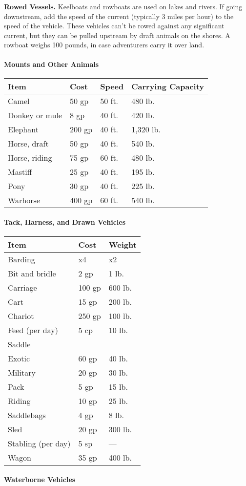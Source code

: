 \documentclass[
]{article}
\begin{document}
\textbf{Rowed Vessels.} Keelboats and rowboats are used on lakes and
rivers. If going downstream, add the speed of the current (typically 3
miles per hour) to the speed of the vehicle. These vehicles can't be
rowed against any significant current, but they can be pulled upstream
by draft animals on the shores. A rowboat weighs 100 pounds, in case
adventurers carry it over land.

\hypertarget{mounts-and-other-animals}{%
\paragraph{Mounts and Other Animals}\label{mounts-and-other-animals}}

\begin{longtable}[]{@{}llll@{}}
\toprule
Item & Cost & Speed & Carrying Capacity\tabularnewline
\midrule
\endhead
Camel & 50 gp & 50 ft. & 480 lb.\tabularnewline
Donkey or mule & 8 gp & 40 ft. & 420 lb.\tabularnewline
Elephant & 200 gp & 40 ft. & 1,320 lb.\tabularnewline
Horse, draft & 50 gp & 40 ft. & 540 lb.\tabularnewline
Horse, riding & 75 gp & 60 ft. & 480 lb.\tabularnewline
Mastiff & 25 gp & 40 ft. & 195 lb.\tabularnewline
Pony & 30 gp & 40 ft. & 225 lb.\tabularnewline
Warhorse & 400 gp & 60 ft. & 540 lb.\tabularnewline
\bottomrule
\end{longtable}

\hypertarget{tack-harness-and-drawn-vehicles}{%
\paragraph{Tack, Harness, and Drawn
Vehicles}\label{tack-harness-and-drawn-vehicles}}

\begin{longtable}[]{@{}lll@{}}
\toprule
Item & Cost & Weight\tabularnewline
\midrule
\endhead
Barding & x4 & x2\tabularnewline
Bit and bridle & 2 gp & 1 lb.\tabularnewline
Carriage & 100 gp & 600 lb.\tabularnewline
Cart & 15 gp & 200 lb.\tabularnewline
Chariot & 250 gp & 100 lb.\tabularnewline
Feed (per day) & 5 cp & 10 lb.\tabularnewline
Saddle & &\tabularnewline
Exotic & 60 gp & 40 lb.\tabularnewline
Military & 20 gp & 30 lb.\tabularnewline
Pack & 5 gp & 15 lb.\tabularnewline
Riding & 10 gp & 25 lb.\tabularnewline
Saddlebags & 4 gp & 8 lb.\tabularnewline
Sled & 20 gp & 300 lb.\tabularnewline
Stabling (per day) & 5 sp & ---\tabularnewline
Wagon & 35 gp & 400 lb.\tabularnewline
\bottomrule
\end{longtable}

\hypertarget{waterborne-vehicles}{%
\paragraph{Waterborne Vehicles}\label{waterborne-vehicles}}
\end{document}
